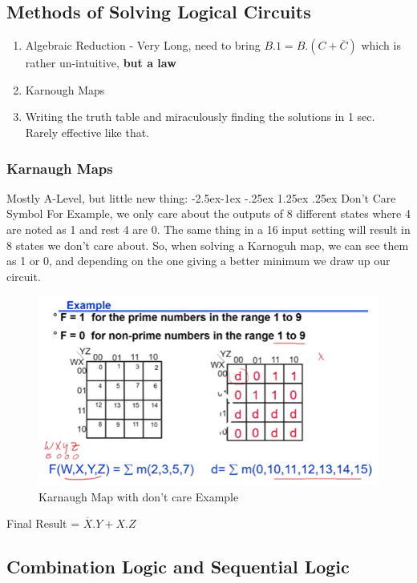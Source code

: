 \documentclass[11pt, a4paper]{article}
\makeatletter
\renewcommand\paragraph{\@startsection{paragraph}{4}{\z@}%
            {-2.5ex\@plus -1ex \@minus -.25ex}%
            {1.25ex \@plus .25ex}%
            {\normalfont\normalsize\bfseries}}
\makeatother
\begin{document}
\subsection{Methods of Solving Logical Circuits}
\begin{enumerate}
    \item Algebraic Reduction - Very Long, need to bring $B.1 = B.(C+\overline{C})$ which is rather un-intuitive, \textbf{but a law}
    \item Karnough Maps
    \item Writing the truth table and miraculously finding the solutions in 1 sec. Rarely effective like that.
\end{enumerate}

\subsubsection{Karnaugh Maps}
Mostly A-Level, but little new thing:
\paragraph{Don't Care Symbol}
For Example, we only care about the outputs of 8 different states where 4 are noted as 1 and rest 4 are 0. The same thing in a 16 input setting will result in 8 states we don't care about. So, when solving a Karnoguh map, we can see them as 1 or 0, and depending on the one giving a better minimum we draw up our circuit.
\begin{figure}[H]
    \centering
    \includegraphics[width = \textwidth]{Pictures/KarnaughMap with dont care.png}
    \caption{Karnaugh Map with don't care Example}
\end{figure}
Final Result = $\overline{X}.Y + X.Z$

\subsection{Combination Logic and Sequential Logic}
\end{document}
